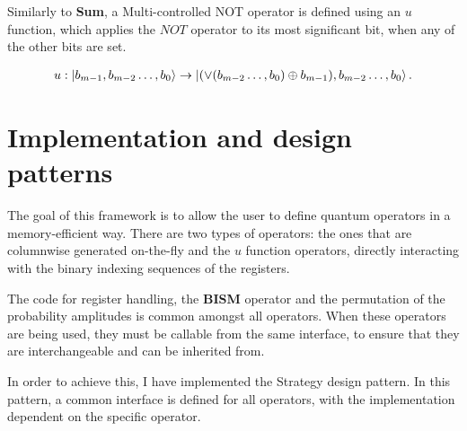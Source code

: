 Similarly to \textbf{Sum}, a Multi-controlled NOT operator is defined using an $u$ function, which applies the $NOT$ operator to its most significant bit, when any of the other bits are set.

\begin{align*}
    u: \ket{b_{m-1},b_{m-2}\dots{},b_0} \rightarrow \ket{(\vee(b_{m-2}\dots{},b_0) \oplus{} b_{m-1}),b_{m-2}\dots{},b_0}.
\end{align*}

\section{Implementation and design patterns}

The goal of this framework is to allow the user to define quantum operators in a memory-efficient way. There are two types of operators: the ones that are columnwise generated on-the-fly and the $u$ function operators, directly interacting with the binary indexing sequences of the registers.

The code for register handling, the \textbf{BISM} operator and the permutation of the probability amplitudes is common amongst all operators. When these operators are being used, they must be callable from the same interface, to ensure that they are interchangeable and can be inherited from.

In order to achieve this, I have implemented the Strategy design pattern. In this pattern, a common interface is defined for all operators, with the implementation dependent on the specific operator.